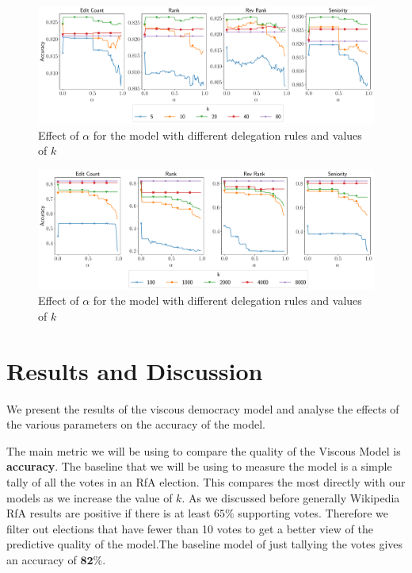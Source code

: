 \begin{figure}[t]
    \centering
    \includegraphics[width=\linewidth]{images/alpha_local.pdf}
    \caption{Effect of $\alpha$ for the \localv model with different delegation rules and values of $k$}
    \label{fig:local-alpha}
\end{figure}
\begin{figure}[t]
    \centering
    \includegraphics[width=\linewidth]{images/alpha_global.pdf}
    \caption{Effect of $\alpha$ for the \globalv model with different delegation rules and values of $k$}
    \label{fig:global-alpha}
\end{figure}

\section{Results and Discussion}

\label{sec:results}
We present the results of the viscous democracy model and analyse the effects of the various parameters on the accuracy of the model.

The main metric we will be using to compare the quality of the Viscous Model is \textbf{accuracy}. The baseline that we will be using to measure the model is a simple tally of all the votes in an RfA election. This compares the most directly with our models as we increase the value of $k$. As we discussed before generally Wikipedia RfA results are positive if there is at least $65\%$ supporting votes. Therefore we filter out elections that have fewer than 10 votes to get a better view of the predictive quality of the model.The baseline model of just tallying the votes gives an accuracy of $\mathbf{82\%}$. 

